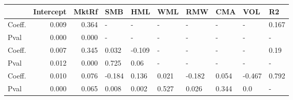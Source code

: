 \begin{tabular}{lrrlllllll}
\toprule
{} &  Intercept &  MktRf &    SMB &    HML &    WML &    RMW &    CMA &    VOL &     R2 \\
\midrule
Coeff.  &      0.009 &  0.364 &      - &      - &      - &      - &      - &      - &  0.167 \\
Pval    &      0.000 &  0.000 &      - &      - &      - &      - &      - &      - &      - \\
Coeff.  &      0.007 &  0.345 &  0.032 & -0.109 &      - &      - &      - &      - &   0.19 \\
Pval    &      0.012 &  0.000 &  0.725 &   0.06 &      - &      - &      - &      - &      - \\
Coeff.  &      0.010 &  0.076 & -0.184 &  0.136 &  0.021 & -0.182 &  0.054 & -0.467 &  0.792 \\
Pval    &      0.000 &  0.065 &  0.008 &  0.002 &  0.527 &  0.026 &  0.344 &    0.0 &      - \\
\bottomrule
\end{tabular}
